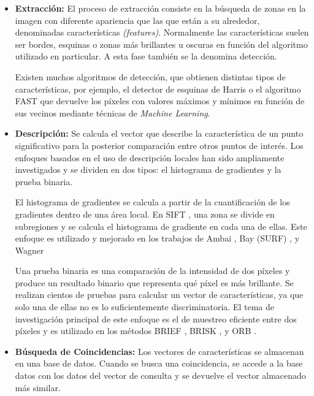 \begin{itemize}
\item\textbf{Extracción:} El proceso de extracción consiste en la búsqueda de zonas en la imagen con diferente apariencia que las que están a su alrededor, denominadas características \emph{(features)}. Normalmente las características suelen ser bordes, esquinas o zonas más brillantes u oscuras en función del algoritmo utilizado en particular. A esta fase también se la denomina detección.

  Existen muchos algoritmos de detección, que obtienen distintas tipos de características, por ejemplo, el detector de esquinas de Harris\cite{Harris} o el algoritmo FAST \cite{Rosten} que devuelve los píxeles con valores máximos y mínimos en función de sus vecinos mediante técnicas de \textit{Machine Learning}.

\item\textbf{Descripción:} Se calcula el vector que describe la característica de un punto significativo para la posterior comparación entre otros puntos de interés. Los enfoques basados en el uso de descripción locales han sido ampliamente investigados y se dividen en dos tipos: el histograma de gradientes y la prueba binaria.

  El histograma de gradientes se calcula a partir de la cuantificación de los gradientes dentro de una área local. En SIFT \cite{Lowe}, una zona se divide en subregiones y se calcula el histograma de gradiente en cada una de ellas. Este enfoque es utilizado y mejorado en los trabajos de Ambai \cite{Ambai}, Bay (SURF) \cite{Bay}, y Wagner \cite{Wagner}

  Una prueba binaria es una comparación de la intensidad de dos píxeles y produce un resultado binario que representa qué píxel es más brillante. Se realizan cientos de pruebas para calcular un vector de características, ya que solo una de ellas no es lo suficientemente discriminatoria. El tema de investigación principal de este enfoque es el de muestreo eficiente entre dos píxeles y es utilizado en los métodos BRIEF \cite{Calonder}, BRISK \cite{Leutenegger}, y ORB \cite{Rublee}. 

\item\textbf{Búsqueda de Coincidencias:} Los vectores de características se almacenan en una base de datos. Cuando se busca una coincidencia, se accede a la base datos con los datos del vector de consulta y se devuelve el vector almacenado más similar.


\end{itemize}
